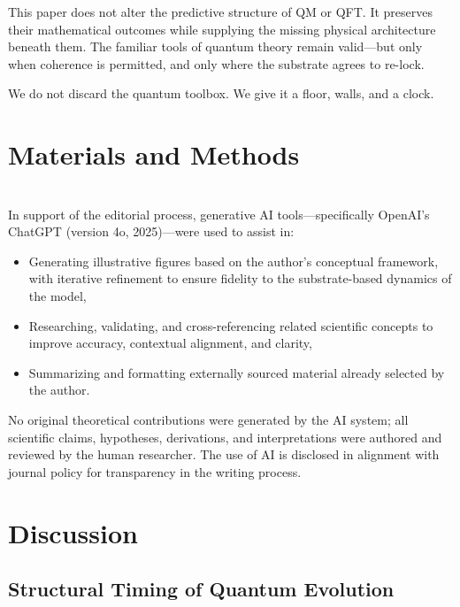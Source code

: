 \documentclass[preprints,article,submit,pdftex,moreauthors]{Definitions/mdpi}
\begin{document}
This paper does not alter the predictive structure of QM or QFT. It preserves their mathematical outcomes while supplying the missing physical architecture beneath them. The familiar tools of quantum theory remain valid---but only when coherence is permitted, and only where the substrate agrees to re-lock.

We do not discard the quantum toolbox. We give it a floor, walls, and a clock.
\section{Materials and Methods}
\qsdmethodstatement
\\
In support of the editorial process, generative AI tools—specifically OpenAI's ChatGPT (version 4o, 2025)—were used to assist in:
\begin{itemize}
    \item Generating illustrative figures based on the author’s conceptual framework, with iterative refinement to ensure fidelity to the substrate-based dynamics of the model,
    \item Researching, validating, and cross-referencing related scientific concepts to improve accuracy, contextual alignment, and clarity,
    \item Summarizing and formatting externally sourced material already selected by the author.
\end{itemize}

No original theoretical contributions were generated by the AI system; all scientific claims, hypotheses, derivations, and interpretations were authored and reviewed by the human researcher. The use of AI is disclosed in alignment with journal policy for transparency in the writing process.


\section{Discussion}
\subsection{Structural Timing of Quantum Evolution}
\end{document}
